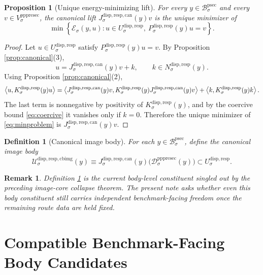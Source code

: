 \documentclass[11pt]{article}
\newcommand{\ProtoSectionBody}[1]{\mathcal B_{#1}^{\mathrm{psec}}}
\newcommand{\PrePreProtoSectionVertical}[1]{V_{#1}^{\mathrm{pppresec}}}
\newcommand{\PrePreProtoSectionResidualBody}[1]{\mathcal D_{#1}^{\mathrm{pppresec}}}
\newcommand{\SubstrateCarrier}[1]{U_{#1}^{\mathrm{disp,resp}}}
\newcommand{\SubstrateProjection}[1]{P_{#1}^{\mathrm{disp,resp}}}
\newcommand{\SubstrateOperator}[1]{K_{#1}^{\mathrm{disp,resp}}}
\newcommand{\SubstrateKernel}[1]{N_{#1}^{\mathrm{disp,resp}}}
\newcommand{\CanonicalLift}[1]{J_{#1}^{\mathrm{disp,resp,can}}}
\newcommand{\CanonicalImageBody}[1]{\mathcal U_{#1}^{\mathrm{disp,resp,cbimg}}}
\newtheorem{definition}{Definition}
\newtheorem{proposition}{Proposition}
\newtheorem{remark}{Remark}
\begin{document}
\begin{proposition}[Unique energy-minimizing lift]
\label{prop:min}
For every \(y\in\ProtoSectionBody{\sigma}\) and every \(v\in\PrePreProtoSectionVertical{\sigma}\), the canonical lift \(\CanonicalLift{\sigma}(y)v\) is the unique minimizer of
\begin{equation}
\min\left\{
\mathscr E_{\sigma}(y,u):
u\in\SubstrateCarrier{\sigma},
\ \SubstrateProjection{\sigma}(y)u=v
\right\}.
\label{eq:minproblem}
\end{equation}
\end{proposition}

\begin{proof}
Let \(u\in\SubstrateCarrier{\sigma}\) satisfy \(\SubstrateProjection{\sigma}(y)u=v\). By Proposition \ref{prop:canonical}(3),
\[
u=\CanonicalLift{\sigma}(y)v+k,
\qquad
k\in\SubstrateKernel{\sigma}(y).
\]
Using Proposition \ref{prop:canonical}(2),
\[
\ev{u,\SubstrateOperator{\sigma}(y)u}
=
\ev{
\CanonicalLift{\sigma}(y)v,
\SubstrateOperator{\sigma}(y)\CanonicalLift{\sigma}(y)v
}
+
\ev{k,\SubstrateOperator{\sigma}(y)k}.
\]
The last term is nonnegative by positivity of \(\SubstrateOperator{\sigma}(y)\), and by the coercive bound \eqref{eq:coercive} it vanishes only if \(k=0\). Therefore the unique minimizer of \eqref{eq:minproblem} is \(\CanonicalLift{\sigma}(y)v\).
\end{proof}

\begin{definition}[Canonical image body]
\label{def:image}
For each \(y\in\ProtoSectionBody{\sigma}\), define the \emph{canonical image body}
\begin{equation}
\CanonicalImageBody{\sigma}(y)
\equiv
\CanonicalLift{\sigma}(y)\bigl(\PrePreProtoSectionResidualBody{\sigma}(y)\bigr)
\subset
\SubstrateCarrier{\sigma}.
\label{eq:imagebody}
\end{equation}
\end{definition}

\begin{remark}
Definition \ref{def:image} is the current body-level constituent singled out by the preceding image-core collapse theorem. The present note asks whether even this body constituent still carries independent benchmark-facing freedom once the remaining route data are held fixed.
\end{remark}

\section{Compatible Benchmark-Facing Body Candidates}
\end{document}
